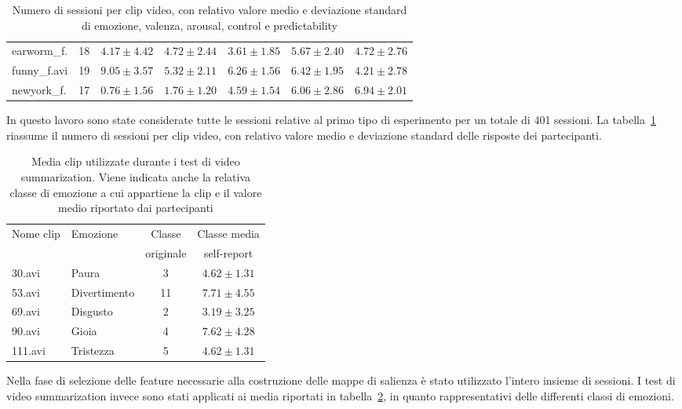 \begin{table}[]
\begin{tabular}{l|c|c|c|c|c|c}
earworm\_f. & 18 & $4.17 \pm 4.42$ & $4.72 \pm 2.44$ & $3.61 \pm 1.85$ & $5.67 \pm 2.40$ & $4.72 \pm 2.76$ \\
funny\_f.avi & 19 & $9.05 \pm 3.57$ & $5.32 \pm 2.11$ & $6.26 \pm 1.56$ & $6.42 \pm 1.95$ & $4.21 \pm 2.78$ \\
newyork\_f. & 17 & $0.76 \pm 1.56$ & $1.76 \pm 1.20$ & $4.59 \pm 1.54$ & $6.06 \pm 2.86$ & $6.94 \pm 2.01$ \\
\end{tabular}
\caption{Numero di sessioni per clip video, con relativo valore medio e deviazione standard di emozione, valenza, arousal, control e predictability}
\label{tab:sessionid_by_media}
\end{table}

In questo lavoro sono state considerate tutte le sessioni relative al primo tipo di esperimento per un totale di 401 sessioni.
La tabella~\ref{tab:sessionid_by_media} riassume il numero di sessioni per clip video, con relativo valore medio e deviazione standard delle risposte dei partecipanti.

\begin{table}[]
\begin{tabular}{l|l|c|c}
Nome clip   & Emozione     & Classe    & Classe media \\
            &              & originale & self-report \\
\hline
30.avi      & Paura        & 3         & $4.62 \pm 1.31$ \\
53.avi      & Divertimento & 11        & $7.71 \pm 4.55$ \\
69.avi      & Disgusto     & 2         & $3.19 \pm 3.25$ \\
90.avi      & Gioia        & 4         & $7.62 \pm 4.28$ \\
111.avi     & Tristezza    & 5         & $4.62 \pm 1.31$ \\
\end{tabular}
\caption{Media clip utilizzate durante i test di video summarization. Viene indicata anche la relativa classe di emozione a cui appartiene la clip e il valore medio riportato dai partecipanti}
\label{tab:used_media}
\end{table}

Nella fase di selezione delle feature necessarie alla costruzione delle mappe di salienza è stato utilizzato l'intero insieme di  sessioni. I test di video summarization invece sono stati applicati ai media riportati in tabella~\ref{tab:used_media}, in quanto rappresentativi delle differenti classi di emozioni.

